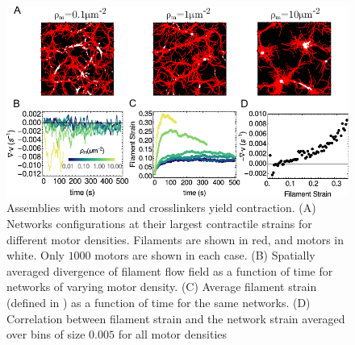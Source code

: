 \documentclass[12pt]{article}
\begin{document}
\begin{figure}[H] 
  \centering
  \includegraphics[scale=1.2]{figs/divergence/div_fig.pdf}
  \caption{%
  \label{fig:contract}%
  Assemblies with motors and crosslinkers yield contraction.
  (A) Networks configurations at their largest contractile strains for different
  motor densities. Filaments are shown in red, and motors in white. Only $1000$
  motors are shown in each case.
  (B) Spatially averaged divergence of filament flow field as a function of time
  for networks of varying motor density. 
  (C) Average filament strain (defined in ) as a function
  of time for the same networks. 
  (D) Correlation between filament strain and the network strain
  averaged over bins of size $0.005$ for all motor densities
 } 
\end{figure}  
\end{document}
